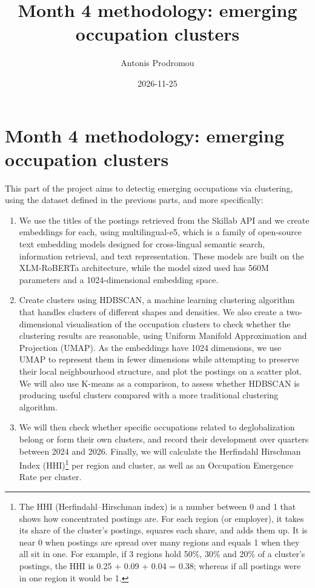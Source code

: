 \documentclass[
  letterpaper,
  DIV=11,
  numbers=noendperiod,
  sfdefaults=false]{scrartcl}
\title{Month 4 methodology: emerging occupation clusters}
\author{Antonis Prodromou}
\date{2026-11-25}
\providecommand{\tightlist}{%
  \setlength{\itemsep}{0pt}\setlength{\parskip}{0pt}}
\begin{document}
\maketitle


\section{Month 4 methodology: emerging occupation
clusters}\label{month-4-methodology-emerging-occupation-clusters}

This part of the project aims to detectig emerging occupations via
clustering, using the dataset defined in the previous parts, and more
specifically:

\begin{enumerate}
\def\labelenumi{(\alph{enumi})}
\tightlist
\item
  We use the titles of the postings retrieved from the Skillab API and
  we create embeddings for each, using multilingual-e5, which is a
  family of open-source text embedding models designed for cross-lingual
  semantic search, information retrieval, and text representation. These
  models are built on the XLM-RoBERTa architecture, while the model
  sized used has 560M parameters and a 1024-dimensional embedding space.
\item
  Create clusters using HDBSCAN, a machine learning clustering algorithm
  that handles clusters of different shapes and densities. We also
  create a two-dimensional visualisation of the occupation clusters to
  check whether the clustering results are reasonable, using Uniform
  Manifold Approximation and Projection (UMAP). As the embeddings have
  1024 dimensions, we use UMAP to represent them in fewer dimensions
  while attempting to preserve their local neighbourhood structure, and
  plot the postings on a scatter plot. We will also use K-means as a
  comparison, to assess whether HDBSCAN is producing useful clusters
  compared with a more traditional clustering algorithm.
\item
  We will then check whether specific occupations related to
  deglobalization belong or form their own clusters, and record their
  development over quarters between 2024 and 2026. Finally, we will
  calculate the Herfindahl Hirschman Index (HHI)\footnote{The HHI
    (Herfindahl--Hirschman index) is a number between 0 and 1 that shows
    how concentrated postings are. For each region (or employer), it
    takes its share of the cluster's postings, squares each share, and
    adds them up. It is near 0 when postings are spread over many
    regions and equals 1 when they all sit in one. For example, if 3
    regions hold 50\%, 30\% and 20\% of a cluster's postings, the HHI is
    0.25 + 0.09 + 0.04 = 0.38; whereas if all postings were in one
    region it would be 1.} per region and cluster, as well as an
  Occupation Emergence Rate per cluster.
\end{enumerate}
\end{document}
